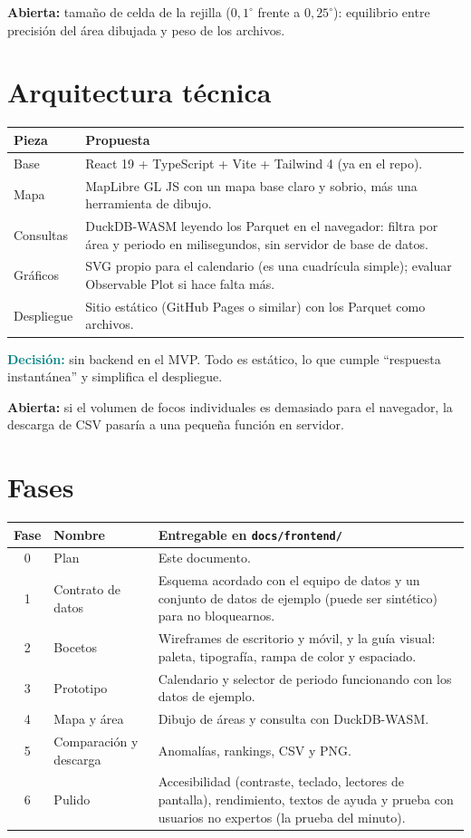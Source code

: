 \documentclass[11pt,a4paper]{article}
\newcommand{\decision}[1]{\textcolor{teal}{\textbf{Decisión:}} #1}
\newcommand{\abierta}[1]{\textcolor{orange!80!black}{\textbf{Abierta:}} #1}
\begin{document}
\abierta{tamaño de celda de la rejilla ($0{,}1^\circ$ frente a $0{,}25^\circ$): equilibrio
entre precisión del área dibujada y peso de los archivos.}

\section{Arquitectura técnica}

\begin{tabularx}{\linewidth}{@{}lX@{}}
\toprule
Pieza & Propuesta \\
\midrule
Base & React 19 + TypeScript + Vite + Tailwind 4 (ya en el repo). \\
Mapa & MapLibre GL JS con un mapa base claro y sobrio, más una herramienta de dibujo. \\
Consultas & DuckDB-WASM leyendo los Parquet en el navegador: filtra por área y periodo
  en milisegundos, sin servidor de base de datos. \\
Gráficos & SVG propio para el calendario (es una cuadrícula simple); evaluar
  Observable Plot si hace falta más. \\
Despliegue & Sitio estático (GitHub Pages o similar) con los Parquet como archivos. \\
\bottomrule
\end{tabularx}

\decision{sin backend en el MVP. Todo es estático, lo que cumple ``respuesta instantánea''
y simplifica el despliegue.}

\abierta{si el volumen de focos individuales es demasiado para el navegador, la descarga
de CSV pasaría a una pequeña función en servidor.}

\section{Fases}\label{sec:fases}

\begin{tabularx}{\linewidth}{@{}clX@{}}
\toprule
Fase & Nombre & Entregable en \texttt{docs/frontend/} \\
\midrule
0 & Plan & Este documento. \\
1 & Contrato de datos & Esquema acordado con el equipo de datos y un conjunto de
  datos de ejemplo (puede ser sintético) para no bloquearnos. \\
2 & Bocetos & Wireframes de escritorio y móvil, y la guía visual: paleta, tipografía,
  rampa de color y espaciado. \\
3 & Prototipo & Calendario y selector de periodo funcionando con los datos de ejemplo. \\
4 & Mapa y área & Dibujo de áreas y consulta con DuckDB-WASM. \\
5 & Comparación y descarga & Anomalías, rankings, CSV y PNG. \\
6 & Pulido & Accesibilidad (contraste, teclado, lectores de pantalla), rendimiento,
  textos de ayuda y prueba con usuarios no expertos (la prueba del minuto). \\
\bottomrule
\end{tabularx}
\end{document}
